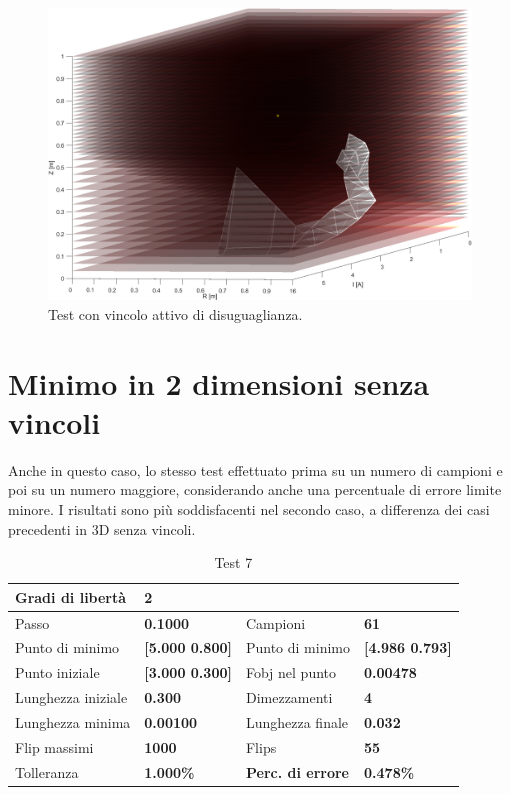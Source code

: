 \documentclass[a4paper, 11pt]{article}
\begin{document}
\begin{figure}[H]
	\centering
		\includegraphics[width=13cm]{assets/figure9}
		\caption{Test con vincolo attivo di disuguaglianza.}
\end{figure}

\newpage
\section{Minimo in 2 dimensioni senza vincoli}

Anche in questo caso, lo stesso test effettuato prima su un numero di campioni e
poi su un numero maggiore, considerando anche una percentuale di errore limite
minore.
I risultati sono più soddisfacenti nel secondo caso, a differenza dei casi
precedenti in 3D senza vincoli.

\begin{table}[h]
	\caption{Test 7}
	\begin{center}
	\begin{tabular}{|l|l|l|l|} 
	\hline 
	Gradi di libertà & \textbf{2} &  &  \\ \hline 
	Passo & \textbf{0.1000} & Campioni & \textbf{61} \\ \hline 
	Punto di minimo & \textbf{{[}5.000 0.800{]}} & Punto di minimo & \textbf{{[}4.986 0.793{]}} \\ \hline 
	Punto iniziale & \textbf{{[}3.000 0.300{]}} & Fobj nel punto & \textbf{0.00478} \\ \hline 
	Lunghezza iniziale & \textbf{0.300} & Dimezzamenti & \textbf{4} \\ \hline 
	Lunghezza minima & \textbf{0.00100} & Lunghezza finale & \textbf{0.032} \\ \hline
	Flip massimi & \textbf{1000} & Flips & \textbf{55} \\ \hline 
	Tolleranza & \textbf{1.000\%} & \textbf{Perc. di errore} & \textbf{0.478\%} \\ \hline 
	\end{tabular}
	\end{center}
	\end{table}
\end{document}

